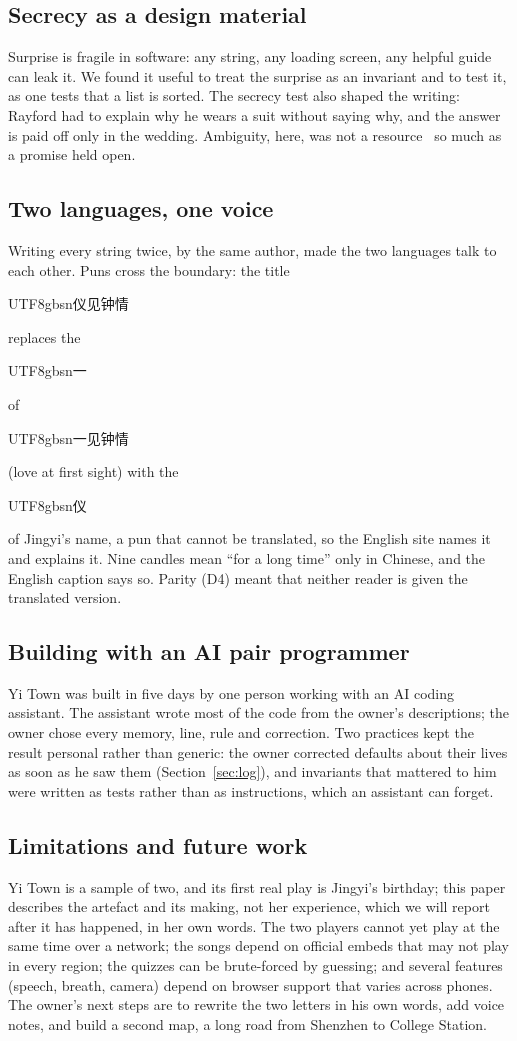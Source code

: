 \documentclass[sigconf,nonacm]{acmart}
\newcommand{\zh}[1]{\begin{CJK*}{UTF8}{gbsn}#1\end{CJK*}}
\newcommand{\yt}{Yi Town}
\newcommand{\dc}[1]{\textsc{D#1}}
\begin{document}
\subsection{Secrecy as a design material}
Surprise is fragile in software: any string, any loading screen, any helpful guide can leak it. We
found it useful to treat the surprise as an invariant and to test it, as one tests that a list is
sorted. The secrecy test also shaped the writing: Rayford had to explain why he wears a suit without
saying why, and the answer is paid off only in the wedding. Ambiguity, here, was not a
resource~\cite{gaver2003ambiguity} so much as a promise held open.

\subsection{Two languages, one voice}
Writing every string twice, by the same author, made the two languages talk to each other. Puns
cross the boundary: the title \zh{仪见钟情} replaces the \zh{一} of \zh{一见钟情} (love at first
sight) with the \zh{仪} of Jingyi's name, a pun that cannot be translated, so the English site names
it and explains it. Nine candles mean ``for a long time'' only in Chinese, and the English caption
says so. Parity (\dc{4}) meant that neither reader is given the translated version.

\subsection{Building with an AI pair programmer}
\yt{} was built in five days by one person working with an AI coding assistant. The assistant
wrote most of the code from the owner's descriptions; the owner chose every memory, line, rule and
correction. Two practices kept the result personal rather than generic: the owner corrected
defaults about their lives as soon as he saw them (Section~\ref{sec:log}), and invariants that mattered to him
were written as tests rather than as instructions, which an assistant can forget.

\subsection{Limitations and future work}
\yt{} is a sample of two, and its first real play is Jingyi's birthday; this paper describes the
artefact and its making, not her experience, which we will report after it has happened, in her
own words. The two players cannot yet play at the same time over a network; the songs depend on
official embeds that may not play in every region; the quizzes can be brute-forced by guessing; and
several features (speech, breath, camera) depend on browser support that varies across phones. The
owner's next steps are to rewrite the two letters in his own words, add voice notes, and build
a second map, a long road from Shenzhen to College Station.
\end{document}
